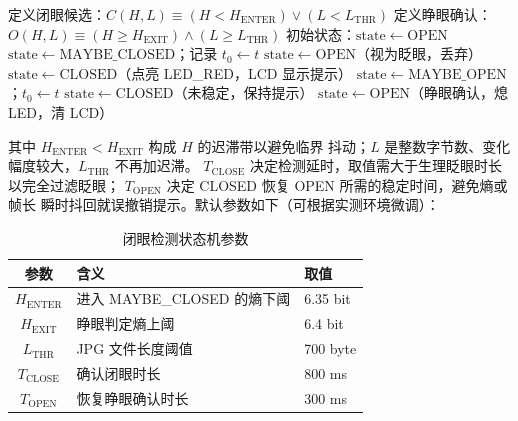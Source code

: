 \documentclass[a4paper]{article}
\begin{document}
\begin{algorithm}[H]
\caption{闭眼检测状态机（$H$ 与 $L$ OR 联合判据）}
\begin{algorithmic}[1]
\STATE 定义闭眼候选：$C(H, L) \equiv (H < H_{\mathrm{ENTER}}) \lor (L < L_{\mathrm{THR}})$
\STATE 定义睁眼确认：$O(H, L) \equiv (H \ge H_{\mathrm{EXIT}}) \land (L \ge L_{\mathrm{THR}})$
\STATE 初始状态：$\mathrm{state} \leftarrow \mathrm{OPEN}$
            \STATE $\mathrm{state} \leftarrow \mathrm{MAYBE\_CLOSED}$；记录 $t_0 \leftarrow t$
        \ENDIF
            \STATE $\mathrm{state} \leftarrow \mathrm{OPEN}$（视为眨眼，丢弃）
            \STATE $\mathrm{state} \leftarrow \mathrm{CLOSED}$（点亮 LED\_RED，LCD 显示提示）
        \ENDIF
            \STATE $\mathrm{state} \leftarrow \mathrm{MAYBE\_OPEN}$；$t_0 \leftarrow t$
        \ENDIF
            \STATE $\mathrm{state} \leftarrow \mathrm{CLOSED}$（未稳定，保持提示）
            \STATE $\mathrm{state} \leftarrow \mathrm{OPEN}$（睁眼确认，熄 LED，清 LCD）
        \ENDIF
    \ENDIF
\ENDWHILE
\end{algorithmic}
\end{algorithm}

其中 $H_{\mathrm{ENTER}} < H_{\mathrm{EXIT}}$ 构成 $H$ 的迟滞带以避免临界
抖动；$L$ 是整数字节数、变化幅度较大，$L_{\mathrm{THR}}$ 不再加迟滞。
$T_{\mathrm{CLOSE}}$ 决定检测延时，取值需大于生理眨眼时长以完全过滤眨眼；
$T_{\mathrm{OPEN}}$ 决定 CLOSED 恢复 OPEN 所需的稳定时间，避免熵或帧长
瞬时抖回就误撤销提示。默认参数如下（可根据实测环境微调）：

\begin{table}[H]
\centering
\caption{闭眼检测状态机参数}
\begin{tabular}{cll}
\toprule
参数 & 含义 & 取值 \\
\midrule
$H_{\mathrm{ENTER}}$ & 进入 MAYBE\_CLOSED 的熵下阈  & 6.35 bit \\
$H_{\mathrm{EXIT}}$  & 睁眼判定熵上阈               & 6.4 bit \\
$L_{\mathrm{THR}}$   & JPG 文件长度阈值             & 700 byte \\
$T_{\mathrm{CLOSE}}$ & 确认闭眼时长                 & 800 ms \\
$T_{\mathrm{OPEN}}$  & 恢复睁眼确认时长             & 300 ms \\
\bottomrule
\end{tabular}
\end{table}
\end{document}
